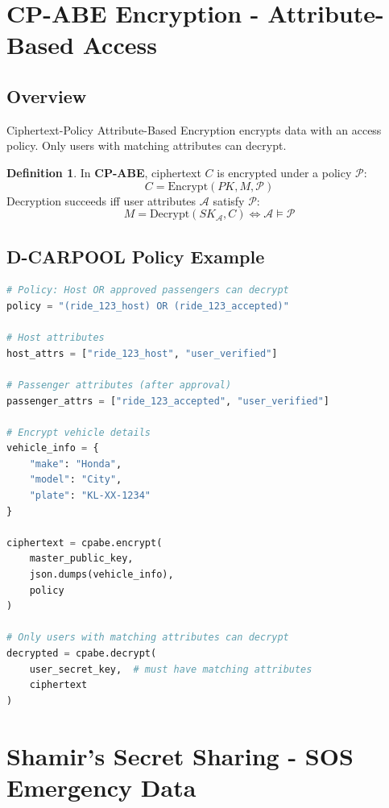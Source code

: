 \documentclass[12pt]{report}
\theoremstyle{plain}
\theoremstyle{definition}
\newtheorem{definition}[theorem]{Definition}
\theoremstyle{remark}
\begin{document}
\section{CP-ABE Encryption - Attribute-Based Access}

\subsection{Overview}

Ciphertext-Policy Attribute-Based Encryption encrypts data with an access policy. Only users with matching attributes can decrypt.

\begin{definition}
In \textbf{CP-ABE}, ciphertext $C$ is encrypted under a policy $\mathcal{P}$:
\begin{equation}
C = \text{Encrypt}(PK, M, \mathcal{P})
\end{equation}
Decryption succeeds iff user attributes $\mathcal{A}$ satisfy $\mathcal{P}$:
\begin{equation}
M = \text{Decrypt}(SK_{\mathcal{A}}, C) \iff \mathcal{A} \models \mathcal{P}
\end{equation}
\end{definition}

\subsection{D-CARPOOL Policy Example}

\begin{lstlisting}[language=Python, caption=CP-ABE Policy for Vehicle Info]
# Policy: Host OR approved passengers can decrypt
policy = "(ride_123_host) OR (ride_123_accepted)"

# Host attributes
host_attrs = ["ride_123_host", "user_verified"]

# Passenger attributes (after approval)
passenger_attrs = ["ride_123_accepted", "user_verified"]

# Encrypt vehicle details
vehicle_info = {
    "make": "Honda",
    "model": "City",
    "plate": "KL-XX-1234"
}

ciphertext = cpabe.encrypt(
    master_public_key,
    json.dumps(vehicle_info),
    policy
)

# Only users with matching attributes can decrypt
decrypted = cpabe.decrypt(
    user_secret_key,  # must have matching attributes
    ciphertext
)
\end{lstlisting}

\section{Shamir's Secret Sharing - SOS Emergency Data}
\end{document}
